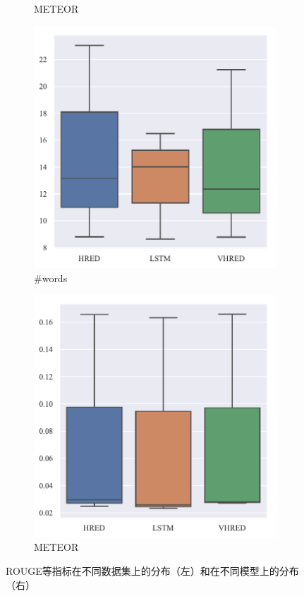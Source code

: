 \begin{figure}[H]
\begin{subfigure}{0.23\linewidth}
        \caption{METEOR}
    \end{subfigure}%
    \begin{subfigure}{0.23\linewidth}
        \centering
        \includegraphics[width=\linewidth]{figure/boxplot/model/utterance_len/plot.pdf}
        \caption{\#words}
    \end{subfigure}%
    \begin{subfigure}{0.23\linewidth}
        \centering
        \includegraphics[width=\linewidth]{figure/boxplot/model/meteor/plot.pdf}
        \caption{METEOR}
    \end{subfigure}
    \centering
    \caption{ROUGE等指标在不同数据集上的分布（左）和在不同模型上的分布（右）}
\end{figure}
